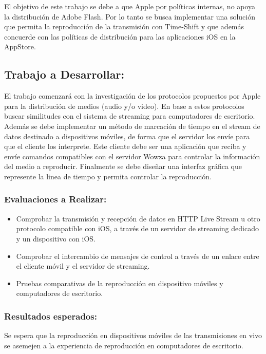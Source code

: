 El objetivo de este trabajo se debe a que Apple por políticas internas, no apoya la distribuci\'on de Adobe Flash. Por lo tanto se busca implementar una soluci\'on que permita la reproducci\'on de la transmisi\'on con Time-Shift y que adem\'as concuerde con las pol\'iticas de distribuci\'on para las aplicaciones iOS en la AppStore.
 
\large
\subsection*{Trabajo a Desarrollar:}
\normalsize
El trabajo comenzar\'a con la investigaci\'on de los protocolos propuestos por Apple para la distribuci\'on de medios (audio y/o video). En base a estos protocolos buscar similitudes con el sistema de streaming para computadores de escritorio. Adem\'as se debe implementar un m\'etodo de marcaci\'on de tiempo en el stream de datos destinado a dispositivos m\'oviles, de forma que el servidor los env\'ie para que el cliente los interprete. Este cliente debe ser una aplicaci\'on que reciba y env\'ie comandos compatibles con el servidor Wowza para controlar la informaci\'on del medio a reproducir. Finalmente se debe dise\~nar una interfaz gr\'afica que represente la linea de tiempo y permita controlar la reproducción.\\

\subsubsection*{Evaluaciones a Realizar:}
\normalsize
\begin{itemize}
\item	Comprobar la transmisión y recepción de datos en HTTP Live Stream u otro protocolo compatible con iOS, a través de un servidor de streaming dedicado y un dispositivo con iOS.
\item	Comprobar el intercambio de mensajes de control a través de un enlace entre el cliente móvil y el servidor de streaming.
\item	Pruebas comparativas de la reproducción en dispositivo móviles y computadores de escritorio.
\end{itemize}

\subsubsection*{Resultados esperados:}
\normalsize
Se espera que la reproducción en dispositivos móviles de las transmisiones en vivo se asemejen a la experiencia de reproducción en computadores de escritorio.\\

